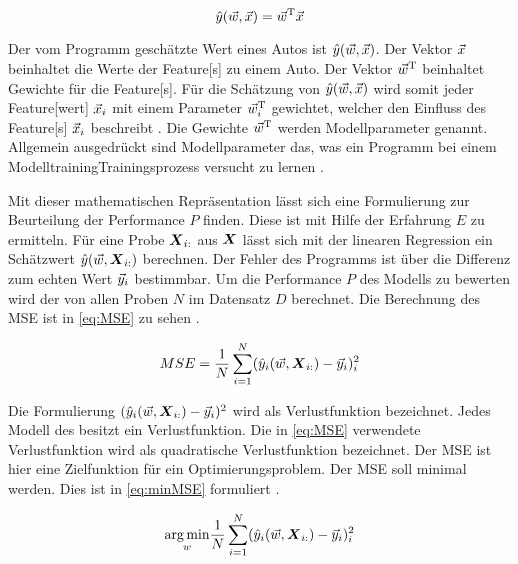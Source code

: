 \begin{equation}
    \label{eq:linReg}
    \hat{y}(\vec{w}, \vec{x}) =  \vec{w}^\mathrm{T}\vec{x}
\end{equation}

Der vom Programm geschätzte Wert eines Autos ist \(\hat{y}(\vec{w}, \vec{x})\). Der Vektor \(\vec{x}\) beinhaltet die Werte der \gls{Feature}[s] zu einem Auto. Der Vektor \(\vec{w}^\mathrm{T}\) beinhaltet Gewichte für die \gls{Feature}[s]. Für die Schätzung von \(\hat{y}(\vec{w}, \vec{x})\) wird somit jeder \gls{Feature}[wert] \(\vec{x}_i\) mit einem Parameter \(\vec{w}^\mathrm{T}_i\) gewichtet, welcher den Einfluss des \gls{Feature}[s] \(\vec{x}_i\) beschreibt \cite{Goodfellow.2016}. Die Gewichte \(\vec{w}^\mathrm{T}\) werden \gls{Modellparameter} genannt. Allgemein ausgedrückt sind \gls{Modellparameter} das, was ein Programm bei einem \gls{Modelltraining}{Trainingsprozess} versucht zu lernen \cite{Zheng.2015}. \par

Mit dieser mathematischen Repräsentation lässt sich eine Formulierung zur Beurteilung der Performance \(P\) finden. Diese ist mit Hilfe der Erfahrung \(E\) zu ermitteln. Für eine Probe \(\boldsymbol{X}_{i:}\) aus \(\boldsymbol{X}\) lässt sich mit der linearen Regression ein Schätzwert \(\hat{y}(\vec{w}, \boldsymbol{X}_{i:})\) berechnen. Der Fehler des Programms ist über die Differenz zum echten Wert \(\vec{y}_i\) bestimmbar. Um die Performance \(P\) des Modells zu bewerten wird der   von allen Proben \(N\) im Datensatz \(D\) berechnet. Die Berechnung des \gls{MSE} ist in \ref{eq:MSE} zu sehen \cite{Goodfellow.2016, Burkov.2019}.

\begin{equation}
    \label{eq:MSE}
    MSE = \frac{1}{N} \sum_{i=1}^{N} (\hat{y}_i(\vec{w}, \boldsymbol{X}_{i:}) - \vec{y}_i)_i^2
\end{equation}

Die Formulierung \((\hat{y}_i(\vec{w}, \boldsymbol{X}_{i:}) - \vec{y}_i)^2\) wird als \gls{Verlustfunktion} bezeichnet. Jedes Modell des  besitzt ein \gls{Verlustfunktion}. Die in \ref{eq:MSE} verwendete \gls{Verlustfunktion} wird als quadratische \gls{Verlustfunktion} bezeichnet. Der \gls{MSE} ist hier eine \gls{Zielfunktion} für ein Optimierungsproblem. Der \gls{MSE} soll minimal werden. Dies ist in \ref{eq:minMSE} formuliert \cite{Goodfellow.2016, Burkov.2019}.

\begin{equation}
    \label{eq:minMSE}
    \underset{w}{\arg\min} \frac{1}{N} \sum_{i=1}^{N} (\hat{y}_i(\vec{w}, \boldsymbol{X}_{i:}) - \vec{y}_i)_i^2
\end{equation}


